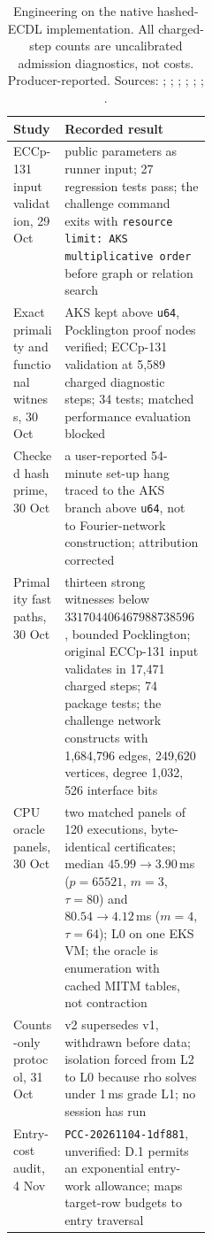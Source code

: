 \begin{table}[t]
\centering\small
\begin{tabularx}{\linewidth}{@{}>{\raggedright\arraybackslash}p{0.26\linewidth}X@{}}
\toprule
Study & Recorded result \\
\midrule
ECCp-131 input validation, 29 Oct & public parameters as runner input; 27 regression tests pass; the challenge command exits with \texttt{resource limit: AKS multiplicative order} before graph or relation search \\
Exact primality and functional witness, 30 Oct & AKS kept above \texttt{u64}, Pocklington proof nodes verified; ECCp-131 validation at 5{,}589 charged diagnostic steps; 34 tests; matched performance evaluation blocked \\
Checked hash prime, 30 Oct & a user-reported 54-minute set-up hang traced to the AKS branch above \texttt{u64}, not to Fourier-network construction; attribution corrected \\
Primality fast paths, 30 Oct & thirteen strong witnesses below $3317044064679887385961981$, bounded Pocklington; original ECCp-131 input validates in 17{,}471 charged steps; 74 package tests; the challenge network constructs with 1{,}684{,}796 edges, 249{,}620 vertices, degree 1{,}032, 526 interface bits \\
CPU oracle panels, 30 Oct & two matched panels of 120 executions, byte-identical certificates; median $45.99\to3.90$\,ms ($p=65521$, $m=3$, $\tau=80$) and $80.54\to4.12$\,ms ($m=4$, $\tau=64$); L0 on one EKS VM; the oracle is enumeration with cached MITM tables, not contraction \\
Counts-only protocol, 31 Oct & v2 supersedes v1, withdrawn before data; isolation forced from L2 to L0 because rho solves under 1\,ms grade L1; no session has run \\
Entry-cost audit, 4 Nov & \texttt{PCC-20261104-1df881}, unverified: D.1 permits an exponential entry-work allowance; maps target-row budgets to entry traversal \\
\bottomrule
\end{tabularx}
\caption[]{Engineering on the native hashed-ECDL implementation. All
charged-step counts are uncalibrated admission diagnostics, not costs.
Producer-reported. Sources: ;
;
;
;
;
;
.}
\label{tab:tn-native}
\end{table}


